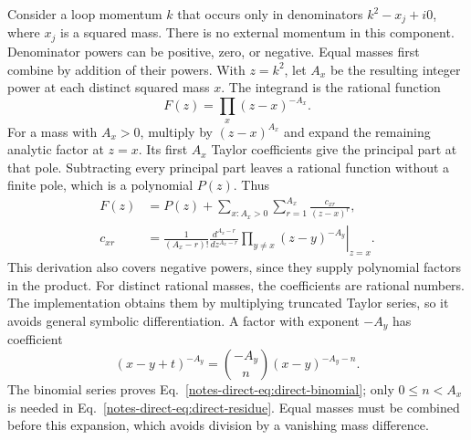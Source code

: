 \documentclass[11pt,a4paper]{article}
\begin{document}
Consider a loop momentum $k$ that occurs only in denominators $k^2-x_j+i0$, where $x_j$ is a squared mass. There is no external momentum in this component. Denominator powers can be positive, zero, or negative. Equal masses first combine by addition of their powers. With $z=k^2$, let $A_x$ be the resulting integer power at each distinct squared mass $x$. The integrand is the rational function
\begin{equation}
 F(z)=\prod_x(z-x)^{-A_x}.
 \label{notes-direct-eq:direct-rational}
\end{equation}
For a mass with $A_x>0$, multiply by $(z-x)^{A_x}$ and expand the remaining analytic factor at $z=x$. Its first $A_x$ Taylor coefficients give the principal part at that pole. Subtracting every principal part leaves a rational function without a finite pole, which is a polynomial $P(z)$. Thus
\begin{align}
 F(z)&=P(z)+\sum_{x:A_x>0}\sum_{r=1}^{A_x}\frac{c_{xr}}{(z-x)^r},\label{notes-direct-eq:direct-apart}\\
 c_{xr}&=\left.\frac{1}{(A_x-r)!}\frac{d^{A_x-r}}{dz^{A_x-r}}
 \prod_{y\ne x}(z-y)^{-A_y}\right|_{z=x}.\label{notes-direct-eq:direct-residue}
\end{align}
This derivation also covers negative powers, since they supply polynomial factors in the product. For distinct rational masses, the coefficients are rational numbers. The implementation obtains them by multiplying truncated Taylor series, so it avoids general symbolic differentiation. A factor with exponent $-A_y$ has coefficient
\begin{equation}
 [t^n](x-y+t)^{-A_y}=\binom{-A_y}{n}(x-y)^{-A_y-n}.
 \label{notes-direct-eq:direct-binomial}
\end{equation}
The binomial series proves Eq.~\eqref{notes-direct-eq:direct-binomial}; only $0\leq n<A_x$ is needed in Eq.~\eqref{notes-direct-eq:direct-residue}. Equal masses must be combined before this expansion, which avoids division by a vanishing mass difference.
\end{document}

